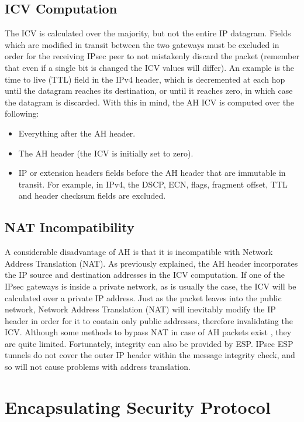 \documentclass[a4paper,12pt]{report}
\begin{document}
		\subsection{ICV Computation}
		The ICV is calculated over the majority, but not the entire IP datagram. Fields which are modified in transit between the two gateways must be excluded in order for the receiving IPsec peer to not mistakenly discard the packet (remember that even if a single bit is changed the ICV values will differ). An example is the time to live (TTL) field in the IPv4 header, which is decremented at each hop until the datagram reaches its destination, or until it reaches zero, in which case the datagram is discarded. With this in mind, the AH ICV is computed over the following:
		\begin{itemize}
			\item Everything after the AH header.
			\item The AH header (the ICV is initially set to zero).
			\item IP or extension headers fields before the AH header that are immutable in transit. For example, in IPv4, the DSCP, ECN, flags, fragment offset, TTL and header checksum fields are excluded.
		\end{itemize}
	
		\subsection{NAT Incompatibility}
			A considerable disadvantage of AH is that it is incompatible with Network Address Translation (NAT). As previously explained, the AH header incorporates the IP source and destination addresses in the ICV computation. If one of the IPsec gateways is inside a private network, as is usually the case, the ICV will be calculated over a private IP address. Just as the packet leaves into the public network, Network Address Translation (NAT) will inevitably modify the IP header in order for it to contain only public addresses, therefore invalidating the ICV. Although some methods to bypass NAT in case of AH packets exist \cite{rfc3715}, they are quite limited. Fortunately, integrity can also be provided by ESP. IPsec ESP tunnels do not cover the outer IP header within the message integrity check, and so will not cause problems with address translation.
			
		\section{Encapsulating Security Protocol}
\end{document}
